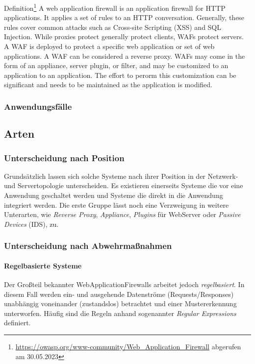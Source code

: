 \textcolor{bhtGray}{ Definition\footnote{\url{https://owasp.org/www-community/Web_Application_Firewall} abgerufen am 30.05.2023}} A web application firewall is an application firewall for HTTP applications. It applies a set of rules to an HTTP conversation. Generally, these rules cover common attacks such as Cross-site Scripting (XSS) and SQL Injection. While proxies protect generally protect clients, WAFs protect servers. A WAF is deployed to protect a specific web application or set of web applications. A WAF can be considered a reverse proxy. WAFs may come in the form of an appliance, server plugin, or filter, and may be customized to an application to an application. The effort to perorm this customization can be significant and needs to be maintained as the application is modified.


\subsubsection{Anwendungsfälle}

\subsection{Arten}

\subsubsection{Unterscheidung nach Position}
Grundsätzlich lassen sich solche Systeme nach ihrer Position in der Netzwerk- und Servertopologie unterscheiden. Es existieren einerseits Systeme die vor eine Anwendung geschaltet werden und Systeme die direkt in die Anwendung integriert werden. Die erste Gruppe lässt noch eine Verzweigung in weitere Unterarten, wie \emph{Reverse Proxy}, \emph{Appliance}, \emph{Plugins} für WebServer oder \emph{Passive Devices} (IDS), zu.


\subsubsection{Unterscheidung nach Abwehrmaßnahmen}

\paragraph{Regelbasierte Systeme}
Der Großteil bekannter WebApplicationFirewalls arbeitet jedoch \emph{regelbasiert}. In diesem Fall werden ein- und ausgehende Datenströme (Requests/Responses) unabhängig voneinander (zustandslos) betrachtet und einer Mustererkennung unterworfen. Häufig sind die Regeln anhand sogenannter \emph{Regular Expressions} definiert.

